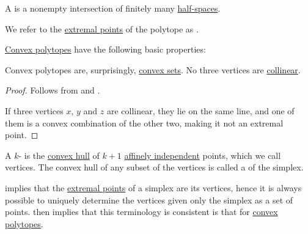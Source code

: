 \begin{definition}\label{def:convex_polytope}\mimprovised
  A  is a nonempty intersection of finitely many \hyperref[def:half_space]{half-spaces}.

  We refer to the \hyperref[def:extremal_point]{extremal points} of the polytope as .
\end{definition}

\begin{proposition}\label{thm:def:convex_polytope}
  \hyperref[def:convex_polytope]{Convex polytopes} have the following basic properties:
  \begin{thmenum}
     Convex polytopes are, surprisingly, \hyperref[def:convex_hull]{convex sets}.
     No three vertices are \hyperref[def:collinear_points]{collinear}.
  \end{thmenum}
\end{proposition}
\begin{proof}
   Follows from  and .

   If three vertices \( x \), \( y \) and \( z \) are collinear, they lie on the same line, and one of them is a convex combination of the other two, making it not an extremal point.
\end{proof}

\begin{definition}\label{def:simplex}\mcite
  A \( k \)- is the \hyperref[def:convex_hull]{convex hull} of \( k + 1 \) \hyperref[def:affine_dependence]{affinely independent} points, which we call vertices. The convex hull of any subset of the vertices is called a  of the simplex.

   implies that the \hyperref[def:extremal_point]{extremal points} of a simplex are its vertices, hence it is always possible to uniquely determine the vertices given only the simplex as a set of points.  then implies that this terminology is consistent is that for \hyperref[def:convex_polytope]{convex polytopes}.
\end{definition}

